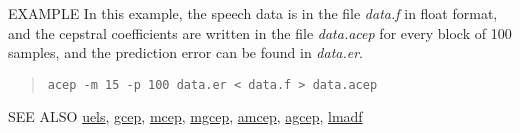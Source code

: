 \begin{options}
\end{options}

\begin{qsection}{EXAMPLE}
	In this example, the speech data is in the file {\em data.f}
        in float format, and the cepstral coefficients are written in
        the file {\em data.acep} for every block of 100 samples,
        and the prediction error can be found in {\em data.er}.
 \begin{quote}
	\verb!acep -m 15 -p 100 data.er < data.f > data.acep!
 \end{quote} 
\end{qsection}

\begin{qsection}{SEE ALSO}
\hyperlink{uels}{uels}, 
\hyperlink{gcep}{gcep}, 
\hyperlink{mcep}{mcep}, 
\hyperlink{mgcep}{mgcep},
\hyperlink{amcep}{amcep},
\hyperlink{agcep}{agcep},
\hyperlink{lmadf}{lmadf}
\end{qsection}
